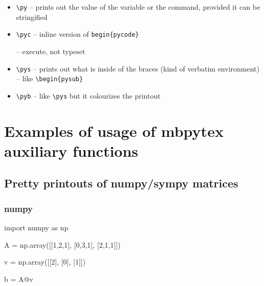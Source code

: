 \documentclass[11pt]{article}
\begin{document}
\begin{itemize}
\begin{itemize}
\item \verb|\py| -- prints out the value of the variable or the command, provided it can be stringified




\item \verb|\pyc| -- inline version of \verb|begin{pycode}|

-- execute, not typeset





\item \verb|\pys| -- prints out what is inside of the braces (kind of verbatim environment) -- like \verb|\begin{pysub}|




\item \verb|\pyb| -- like \verb|\pys| but it colourizes the printout




\end{itemize}

\end{itemize}

\section{Examples of usage of mbpytex auxiliary functions}


\subsection{Pretty printouts of numpy/sympy matrices}

\subsubsection{numpy}
\begin{pyblock}
import numpy as np

A = np.array([[1,2,1],
              [0,3,1],
              [2,1,1]])
              
v = np.array([[2],
              [0],
              [1]])
              
b = A@v
\end{pyblock}
\end{document}
